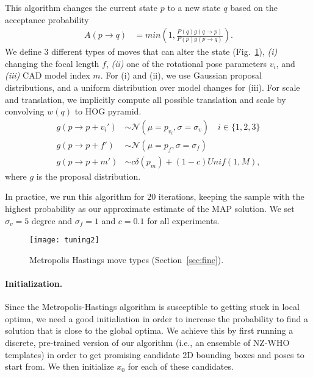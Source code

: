 This algorithm changes the current state $p$ to a new state $q$ based
on the acceptance probability
\begin{align}
    A(p \rightarrow q) & =  min\left( 1,  \frac{P(q) g(q \rightarrow p)}{P(p) g(p \rightarrow q)}\right).
\end{align}
We define $3$ different types of moves that can alter the state
(Fig.~\ref{fig:moves}), {\em (i)} changing the focal length $f$, {\em
(ii)} one of the rotational pose parameters $v_i$, and {\em (iii)} CAD model
index $m$. For (i) and (ii), we use Gaussian proposal distributions, and a uniform
distribution over model changes for (iii). For scale and translation, we
implicitly compute all possible translation and scale by convolving $w(q)$ to
HOG pyramid.
\begin{align}
    g(p \rightarrow p + v_i') & \sim \mathcal{N}(\mu = p_{v_i},\sigma = \sigma_v) \quad i \in \{1,2,3\}\\
    g(p \rightarrow p + f') & \sim \mathcal{N}(\mu = p_{f},\sigma = \sigma_f)\\
    g(p \rightarrow p + m') & \sim c \delta(p_m) + (1-c) Unif(1,M),
\end{align}
where $g$ is the proposal distribution. %
%

In practice, we run this algorithm for 20 iterations, keeping
the sample with the highest probability as our approximate estimate of
the MAP solution. We set $\sigma_v = 5$ degree and $\sigma_f = 1$ and
$c = 0.1$ for all experiments.

\begin{figure}[t]
\centering
    \texttt{[image: tuning2]} \\ [-5pt]
    \caption{Metropolis Hastings move types (Section~\ref{sec:fine}).}
 \label{fig:moves}
\end{figure}


\paragraph{Initialization.}
Since the Metropolis-Hastings algorithm is susceptible to getting
stuck in local optima, we need a good initialiation in order to
increase the probability to find a solution that is close to the
global optima. We achieve this by first running a discrete,
pre-trained version of our algorithm (i.e., an ensemble of NZ-WHO
templates) in order to get promising candidate 2D bounding boxes and
poses to start from. We then initialize $x_0$ for each of these candidates.
